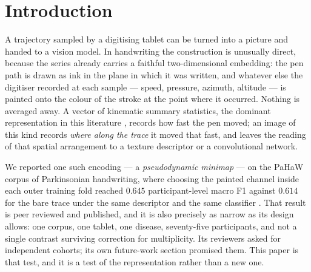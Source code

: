 
\section{Introduction}
\label{sec:intro}

A trajectory sampled by a digitising tablet can be turned into a picture and handed to a vision
model. In handwriting the construction is unusually direct, because the series already carries a
faithful two-dimensional embedding: the pen path is drawn as ink in the plane in which it was
written, and whatever else the digitiser recorded at each sample --- speed, pressure, azimuth,
altitude --- is painted onto the colour of the stroke at the point where it occurred. Nothing is
averaged away. A vector of kinematic summary statistics, the dominant representation in this
literature \citep{drotar2016pahaw,drotar2020dysgraphia}, records how fast the pen moved; an image
of this kind records \emph{where along the trace} it moved that fast, and leaves the reading of
that spatial arrangement to a texture descriptor or a convolutional network.

We reported one such encoding --- a \emph{pseudodynamic minimap} --- on the PaHaW corpus of
Parkinsonian handwriting, where choosing the painted channel inside each outer training fold
reached $0.645$ participant-level macro F1 against $0.614$ for the bare trace under the same
descriptor and the same classifier \citep{prior2027minimaps}. That result is peer reviewed and
published, and it is also precisely as narrow as its design allows: one corpus, one tablet, one
disease, seventy-five participants, and not a single contrast surviving correction for
multiplicity. Its reviewers asked for independent cohorts; its own future-work section promised
them. This paper is that test, and it is a test of the representation rather than a new one.

